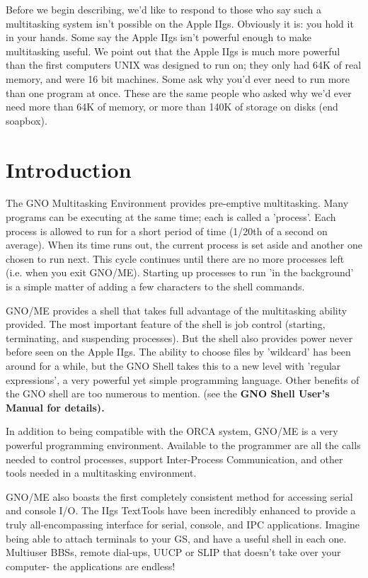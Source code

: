 Before we begin describing, we'd like to
respond to those who say such a multitasking system isn't
possible on the Apple IIgs. Obviously it is: you hold it in your
hands. Some say the Apple IIgs isn't powerful enough to make
multitasking useful. We point out that the Apple IIgs is much
more powerful than the first computers UNIX was designed to run
on; they only had 64K of real memory, and were 16 bit machines.
Some ask why you'd ever need to run more than one program at
once. These are the same people who asked why we'd ever need more
than 64K of memory, or more than 140K of storage on disks (end
soapbox).

\chapter{Introduction}

The GNO Multitasking Environment provides
pre-emptive multitasking. Many programs can be executing at the
same time; each is called a 'process'. Each process is allowed to
run for a short period of time (1/20th of a second on average).
When its time runs out, the current process is set aside and
another one chosen to run next. This cycle continues until there
are no more processes left (i.e. when you exit GNO/ME). Starting
up processes to run 'in the background' is a simple matter of
adding a few characters to the shell commands.

GNO/ME provides a shell that takes full
advantage of the multitasking ability provided. The most
important feature of the shell is job control (starting,
terminating, and suspending processes). But the shell also
provides power never before seen on the Apple IIgs. The ability
to choose files by 'wildcard' has been around for a while, but
the GNO Shell takes this to a new level with 'regular
expressions', a very powerful yet simple programming language.
Other benefits of the GNO shell are too numerous to mention. (see
the \bf GNO Shell User's Manual \rm for details).

In addition to being compatible with the
ORCA system, GNO/ME is a very powerful programming environment.
Available to the programmer are all the calls needed to control
processes, support Inter-Process Communication, and other tools
needed in a multitasking environment.

GNO/ME also boasts the first completely
consistent method for accessing serial and console I/O. The IIgs
TextTools have been incredibly enhanced to provide a truly
all-encompassing interface for serial, console, and IPC
applications. Imagine being able to attach terminals to your GS,
and have a useful shell in each one. Multiuser BBSs, remote
dial-ups, UUCP or SLIP that doesn't take over your computer- the
applications are endless!


